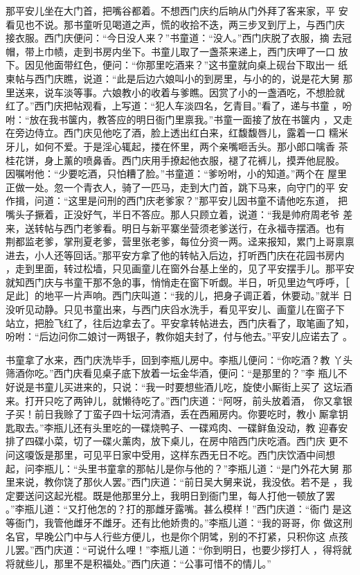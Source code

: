 那平安儿坐在大门首，把嘴谷都着。不想西门庆约后晌从门外拜了客来家，平
安看见也不说。那书童听见喝道之声，慌的收拾不迭，两三步叉到厅上，与西门庆
接衣服。西门庆便问：“今日没人来？”书童道：“没人。”西门庆脱了衣服，摘
去冠帽，带上巾帻，走到书房内坐下。书童儿取了一盏茶来递上，西门庆呷了一口
放下。因见他面带红色，便问：“你那里吃酒来？”这书童就向桌上砚台下取出一
纸柬帖与西门庆瞧，说道：“此是后边六娘叫小的到房里，与小的的，说是花大舅
那里送来，说车淡等事。六娘教小的收着与爹瞧。因赏了小的一盏酒吃，不想脸就
红了。”西门庆把帖观看，上写道：“犯人车淡四名，乞青目。”看了，递与书童
，吩咐：“放在我书箧内，教答应的明日衙门里禀我。”书童一面接了放在书箧内
，又走在旁边侍立。西门庆见他吃了酒，脸上透出红白来，红馥馥唇儿，露着一口
糯米牙儿，如何不爱。于是淫心辄起，搂在怀里，两个亲嘴咂舌头。那小郎口噙香
茶桂花饼，身上薰的喷鼻香。西门庆用手撩起他衣服，褪了花裤儿，摸弄他屁股。
因嘱咐他：“少要吃酒，只怕糟了脸。”书童道：“爹吩咐，小的知道。”两个在
屋里正做一处。忽一个青衣人，骑了一匹马，走到大门首，跳下马来，向守门的平
安作揖，问道：“这里是问刑的西门庆老爹家？”那平安儿因书童不请他吃东道，
把嘴头子撅着，正没好气，半日不答应。那人只顾立着，说道：“我是帅府周老爷
差来，送转帖与西门老爹看。明日与新平寨坐营须老爹送行，在永福寺摆酒。也有
荆都监老爹，掌刑夏老爹，营里张老爹，每位分资一两。迳来报知，累门上哥禀禀
进去，小人还等回话。”那平安方拿了他的转帖入后边，打听西门庆在花园书房内
，走到里面，转过松墙，只见画童儿在窗外台基上坐的，见了平安摆手儿。那平安
就知西门庆与书童干那不急的事，悄悄走在窗下听觑。半日，听见里边气呼呼，［
足此］的地平一片声响。西门庆叫道：“我的儿，把身子调正着，休要动。”就半
日没听见动静。只见书童出来，与西门庆舀水洗手，看见平安儿、画童儿在窗子下
站立，把脸飞红了，往后边拿去了。平安拿转帖进去，西门庆看了，取笔画了知，
吩咐：“后边问你二娘讨一两银子，教你姐夫封了，付与他去。”平安儿应诺去了
。

书童拿了水来，西门庆洗毕手，回到李瓶儿房中。李瓶儿便问：“你吃酒？教
丫头筛酒你吃。”西门庆看见桌子底下放着一坛金华酒，便问：“是那里的？”李
瓶儿不好说是书童儿买进来的，只说：“我一时要想些酒儿吃，旋使小厮街上买了
这坛酒来。打开只吃了两钟儿，就懒待吃了。”西门庆道：“阿呀，前头放着酒，
你又拿银子买！前日我赊了丁蛮子四十坛河清酒，丢在西厢房内。你要吃时，教小
厮拿钥匙取去。”李瓶儿还有头里吃的一碟烧鸭子、一碟鸡肉、一碟鲜鱼没动，教
迎春安排了四碟小菜，切了一碟火薰肉，放下桌儿，在房中陪西门庆吃酒。西门庆
更不问这嗄饭是那里，可见平日家中受用，这样东西无日不吃。西门庆饮酒中间想
起，问李瓶儿：“头里书童拿的那帖儿是你与他的？”李瓶儿道：“是门外花大舅
那里来说，教你饶了那伙人罢。”西门庆道：“前日吴大舅来说，我没依。若不是
，我定要送问这起光棍。既是他那里分上，我明日到衙门里，每人打他一顿放了罢
。”李瓶儿道：“又打他怎的？打的那雌牙露嘴。甚么模样！”西门庆道：“衙门
是这等衙门，我管他雌牙不雌牙。还有比他娇贵的。”李瓶儿道：“我的哥哥，你
做这刑名官，早晚公门中与人行些方便儿，也是你个阴骘，别的不打紧，只积你这
点孩儿罢。”西门庆道：“可说什么哩！”李瓶儿道：“你到明日，也要少拶打人
，得将就将就些儿，那里不是积福处。”西门庆道：“公事可惜不的情儿。”

